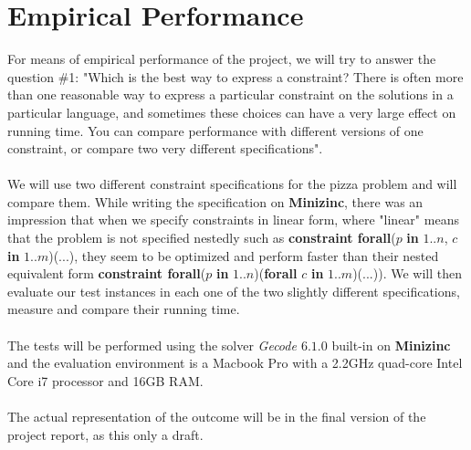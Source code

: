 \documentclass[conference]{IEEEtran}
\newcommand\tab[1][0.3cm]{\hspace*{#1}}
\begin{document}
\section{Empirical Performance}
For means of empirical performance of the project, we will try to answer the question \#1: "Which is the best way to express a constraint? There is often more than one reasonable way to express a particular constraint on the solutions in a particular language, and sometimes these choices can have a very large effect on running time. You can compare performance with different versions of one constraint, or compare two very different specifications".
\\
\\
\tab We will use two different constraint specifications for the pizza problem and will compare them. While writing the specification on \textbf{Minizinc}, there was an impression that when we specify constraints in linear form, where "linear" means that the problem is not specified nestedly such as \textbf{constraint forall}($p$ \textbf{in} $1..n$, $c$ \textbf{in} $1..m$)($...$), they seem to be optimized and perform faster than their nested equivalent form \textbf{constraint forall}($p$ \textbf{in} $1..n$)(\textbf{forall} $c$ \textbf{in} $1..m$)($...$)). We will then evaluate our test instances in each one of the two slightly different specifications, measure and compare their running time.
\\
\\
\tab The tests will be performed using the solver \textit{Gecode $6.1.0$} built-in on \textbf{Minizinc} and the evaluation environment is a Macbook Pro with a 2.2GHz quad-core Intel Core i7 processor and 16GB RAM.
\\
\\
The actual representation of the outcome will be in the final version of the project report, as this only a draft.
\end{document}
